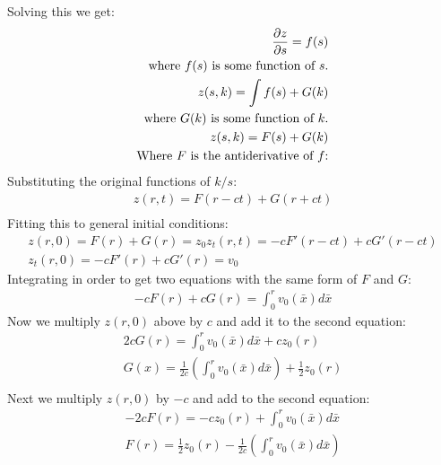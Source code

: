 \documentclass{article}
\begin{document}
Solving this we get:
\begin{equation}
\begin{aligned}
\pdv{z}{s} = f(s)\\
\text{where $f(s)$ is some function of $s$.}\\
z(s,k) = \int f(s) + G(k)\\
\text{where $G(k)$ is some function of $k$.}\\
z(s,k) = F(s) + G(k)\\
\text{Where $F$ is the antiderivative of $f$:}\\
\end{aligned}
\end{equation}
Substituting the original functions of $k/s$:
\begin{equation}
\begin{aligned}
z(r,t) = F(r-ct) + G(r+ct)\\
\end{aligned}
\end{equation}
Fitting this to general initial conditions:
\begin{equation}
\begin{aligned}
z(r,0) = F(r) + G(r) = z_0
z_t(r,t) = -cF'(r - ct) + cG'(r-ct)\\
z_t(r,0) = -cF'(r) + cG'(r) = v_0
\end{aligned}
\end{equation}
Integrating in order to get two equations with the same form of $F$ and $G$:
\begin{equation}
\begin{aligned}
-cF(r) + cG(r) = \int_0^r v_0(\bar{x})d\bar{x}
\end{aligned}
\end{equation}
Now we multiply $z(r,0)$ above by $c$ and add it to the second equation:
\begin{equation}
\begin{aligned}
2cG(r) = \int_0^r v_0(\bar{x})d\bar{x} + cz_0(r)\\
G(x) = \frac{1}{2c}(\int_0^r v_0(\bar{x})d\bar{x}) + \frac{1}{2}z_0(r)\\
\end{aligned}
\end{equation}
Next we multiply $z(r,0)$ by $-c$ and add to the second equation:
\begin{equation}
\begin{aligned}
-2cF(r) = -c z_0(r)  +  \int_0^r v_0(\bar{x})d\bar{x}\\
F(r) = \frac{1}{2}z_0(r) - \frac{1}{2c}(\int_0^r v_0(\bar{x})d\bar{x}) 
\end{aligned}
\end{equation}
\end{document}
